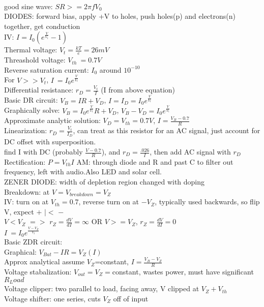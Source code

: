 \documentclass{article}
\begin{document}
\begin{large}
\\good sine wave: $SR>=2\pi f V_0$
\\DIODES:     forward bias, apply +V to holes, push holes(p) and electrons(n) together, get conduction
\\IV: $I=I_0(e^{\frac{V}{V_t}}-1)$
\\Thermal voltage: $V_t=\frac{kT}{e}=26mV$
\\Threashold voltage: $V_{th}~=0.7V$
\\Reverse saturation current: $I_0$ around $10^{-10}$
\\For $V>>V_t$, $I~=I_0e^{\frac{V}{V_t}}$
\\Differential resistance: $r_D=\frac{V_t}{I}$ (I from above equation)
\\Basic DR circuit: $V_B=IR+V_D$, $I=I_D=I_0e^{\frac{V}{V_t}}$
\\Graphically solve: $V_B=I_0e^{\frac{V}{V_t}}R+V_D$, $V_B-V_D=I_0e^{\frac{V}{V_t}}$
\\Approximate analytic solution: $V_D=V_{th}=0.7V$, $I=\frac{V_B-0.7}{R}$
\\Linearization: $r_D=\frac{V_t}{I_D}$, can treat as this resistor for an AC signal, just account for DC offset with superposition.
\\find I with DC (probably $\frac{V-0.7}{R}$), and $r_D=\frac{.026}{I}$, then add AC signal with $r_D$
\\Rectification: $P=V_{th}I$   AM: through diode and R and past C to filter out frequency, left with audio.Also LED and solar cell.
\\ZENER DIODE:  width of depletion region changed with doping
\\Breakdown: at $V=V_{breakdown}=V_Z$
\\IV: turn on at $V_{th}=0.7$, reverse turn on at $-V_Z$, typically used backwards, so flip V, expect $+$   $|<$  $-$
\\$V<V_Z$ $=>$ $r_Z=\frac{dV}{dI}=\infty$ OR $V>=V_Z$, $r_Z=\frac{dV}{dI}=0$
\\$I~=I_0e^{\frac{V-V_Z}{V_t}}$
\\Basic ZDR circuit:
\\Graphical: $V_{Bat}-IR=V_Z(I)$
\\Approx analytical assume $V_Z$=constant, $I=\frac{V_B-V_Z}{R}$
\\Voltage stabalization: $V_{out}=V_Z=$constant, wastes power, must have significant $R_Load$
\\Voltage clipper: two parallel to load, facing away, V clipped at $V_Z+V_{th}$
\\Voltage shifter: one series, cuts $V_Z$ off of input



\end{large}
\end{document}
